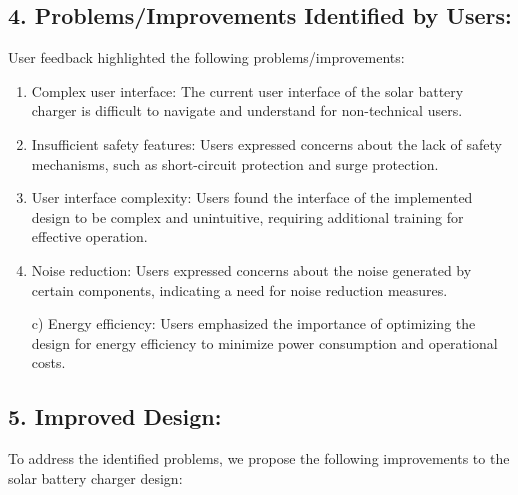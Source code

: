 \documentclass[twocolumn]{article}
\begin{document}
\subsection*{4. Problems/Improvements Identified by Users:}

\noindent User feedback highlighted the following problems/improvements:

\begin{enumerate}

    \item Complex user interface: The current user interface of the solar battery charger is difficult to navigate and understand for non-technical users.
    \item Insufficient safety features: Users expressed concerns about the lack of safety mechanisms, such as short-circuit protection and surge protection.
    \item User interface complexity: Users found the interface of the implemented design to be complex and unintuitive, requiring additional training for effective operation.
    \item Noise reduction: Users expressed concerns about the noise generated by certain components, indicating a need for noise reduction measures.

c) Energy efficiency: Users emphasized the importance of optimizing the design for energy efficiency to minimize power consumption and operational costs.

\end{enumerate}

\subsection*{5. Improved Design:}

\noindent To address the identified problems, we propose the following improvements to the solar battery charger design:
\end{document}
